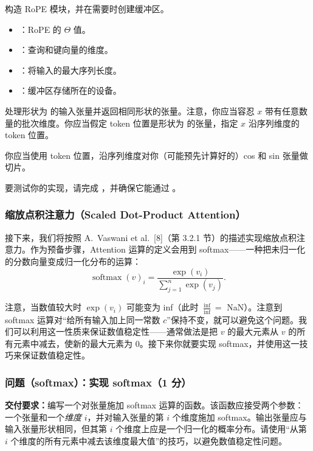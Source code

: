\quad 构造 RoPE 模块，并在需要时创建缓冲区。
\begin{itemize}
  \item {}：RoPE 的 $\Theta$ 值。
  \item {}：查询和键向量的维度。
  \item {}：将输入的最大序列长度。
  \item {}：缓冲区存储所在的设备。
\end{itemize}

\quad 处理形状为  的输入张量并返回相同形状的张量。注意，你应当容忍 $x$ 带有任意数量的批次维度。你应当假定 token 位置是形状为  的张量，指定 $x$ 沿序列维度的 token 位置。

你应当使用 token 位置，沿序列维度对你（可能预先计算好的）cos 和 sin 张量做切片。

要测试你的实现，请完成 ，并确保它能通过 。

\subsubsection{缩放点积注意力（Scaled Dot-Product Attention）}

接下来，我们将按照 A.~Vaswani et al.~[8]（第 3.2.1 节）的描述实现缩放点积注意力。作为预备步骤，Attention 运算的定义会用到 softmax——一种把未归一化的分数向量变成归一化分布的运算：
\begin{equation}
\operatorname{softmax}(v)_i = \frac{\exp(v_i)}{\sum_{j=1}^{n} \exp(v_j)}.
\tag{10}
\end{equation}

注意，当数值较大时 $\exp(v_i)$ 可能变为 inf（此时 $\tfrac{\inf}{\inf} = $ NaN）。注意到 softmax 运算对``给所有输入加上同一常数 $c$''保持不变，就可以避免这个问题。我们可以利用这一性质来保证数值稳定性——通常做法是把 $v$ 的最大元素从 $v$ 的所有元素中减去，使新的最大元素为 0。接下来你就要实现 softmax，并使用这一技巧来保证数值稳定性。

\subsubsection*{问题（softmax）：实现 softmax（1 分）}

\textbf{交付要求：}编写一个对张量施加 softmax 运算的函数。该函数应接受两个参数：一个张量和一个\textit{维度} $i$，并对输入张量的第 $i$ 个维度施加 softmax。输出张量应与输入张量形状相同，但其第 $i$ 个维度上应是一个归一化的概率分布。请使用``从第 $i$ 个维度的所有元素中减去该维度最大值''的技巧，以避免数值稳定性问题。

